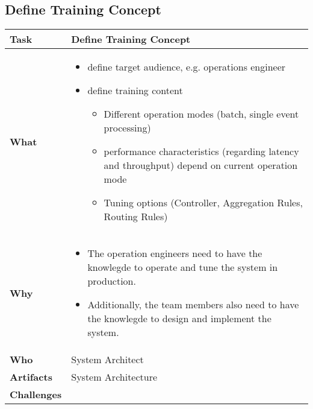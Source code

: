 \subsection{Define Training Concept}
\begin{minipage}{\textwidth}
 \label{table:ch6_Task_Define_Training_Concept}
\begin{tabular}
	{|m{3cm}|m{10cm}|} \hline \bfseries Task & Define Training Concept\\
	\hline \bfseries What & 
	\begin{itemize}
		\item define target audience, e.g. operations engineer
		\item define training content
		\begin{itemize}
			\item Different operation modes (batch, single event processing)
			\item performance characteristics (regarding latency and throughput) depend on current operation mode
			\item Tuning options (Controller, Aggregation Rules, Routing Rules)
		\end{itemize}
	\end{itemize}
	\\
	\hline \bfseries Why & 
	\begin{itemize}
		\item The operation engineers need to have the knowlegde to operate and tune the system in production.
		\item Additionally, the team members also need to have the knowlegde to design and implement the system.
	\end{itemize}
	\\
	\hline \bfseries Who & System Architect\\
	\hline \bfseries Artifacts & System Architecture\\
	\hline \bfseries Challenges & \\
	\hline 
\end{tabular}
\end{minipage}

